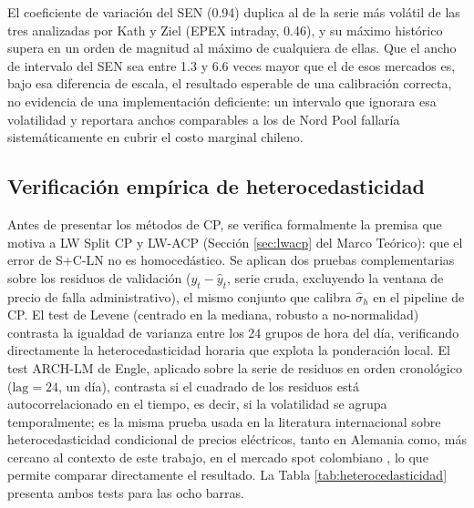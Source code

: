 El coeficiente de variación del SEN (0.94) duplica al de la serie más volátil de las tres analizadas por Kath y Ziel (EPEX intraday, 0.46), y su máximo histórico supera en un orden de magnitud al máximo de cualquiera de ellas. Que el ancho de intervalo del SEN sea entre 1.3 y 6.6 veces mayor que el de esos mercados es, bajo esa diferencia de escala, el resultado esperable de una calibración correcta, no evidencia de una implementación deficiente: un intervalo que ignorara esa volatilidad y reportara anchos comparables a los de Nord Pool fallaría sistemáticamente en cubrir el costo marginal chileno.

\subsection{Verificación empírica de heterocedasticidad}
\label{sec:verificacion_heterocedasticidad}

Antes de presentar los métodos de CP, se verifica formalmente la premisa que motiva a LW Split CP y LW-ACP (Sección \ref{sec:lwacp} del Marco Teórico): que el error de S+C-LN no es homocedástico. Se aplican dos pruebas complementarias sobre los residuos de validación ($y_t - \hat{y}_t$, serie cruda, excluyendo la ventana de precio de falla administrativo), el mismo conjunto que calibra $\hat{\sigma}_h$ en el pipeline de CP. El test de Levene (centrado en la mediana, robusto a no-normalidad) contrasta la igualdad de varianza entre los 24 grupos de hora del día, verificando directamente la heterocedasticidad horaria que explota la ponderación local. El test ARCH-LM de Engle, aplicado sobre la serie de residuos en orden cronológico ($\text{lag}=24$, un día), contrasta si el cuadrado de los residuos está autocorrelacionado en el tiempo, es decir, si la volatilidad se agrupa temporalmente; es la misma prueba usada en la literatura internacional sobre heterocedasticidad condicional de precios eléctricos, tanto en Alemania \cite{BenhmadPercebois2018, FletenParaschivSchurle2013} como, más cercano al contexto de este trabajo, en el mercado spot colombiano \cite{BelloBeltran2010}, lo que permite comparar directamente el resultado. La Tabla \ref{tab:heterocedasticidad} presenta ambos tests para las ocho barras.

